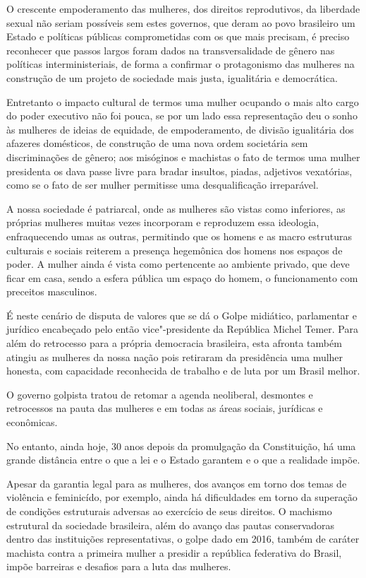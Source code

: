 O crescente empoderamento das mulheres, dos direitos reprodutivos, da
liberdade sexual não seriam possíveis sem estes governos, que deram ao
povo brasileiro um Estado e políticas públicas comprometidas com os que
mais precisam, é preciso reconhecer que passos largos foram dados na
transversalidade de gênero nas políticas interministeriais, de forma a
confirmar o protagonismo das mulheres na construção de um projeto de
sociedade mais justa, igualitária e democrática.

Entretanto o impacto cultural de termos uma mulher ocupando o mais alto
cargo do poder executivo não foi pouca, se por um lado essa
representação deu o sonho às mulheres de ideias de equidade, de
empoderamento, de divisão igualitária dos afazeres domésticos, de
construção de uma nova ordem societária sem discriminações de gênero;
aos misóginos e machistas o fato de termos uma mulher presidenta os dava
passe livre para bradar insultos, piadas, adjetivos vexatórias, como se
o fato de ser mulher permitisse uma desqualificação irreparável.

A nossa sociedade é patriarcal, onde as mulheres são vistas como
inferiores, as próprias mulheres muitas vezes incorporam e reproduzem
essa ideologia, enfraquecendo umas as outras, permitindo que os homens e
as macro estruturas culturais e sociais reiterem a presença hegemônica
dos homens nos espaços de poder. A mulher ainda é vista como pertencente
ao ambiente privado, que deve ficar em casa, sendo a esfera pública um
espaço do homem, o funcionamento com preceitos masculinos.

É neste cenário de disputa de valores que se dá o Golpe midiático,
parlamentar e jurídico encabeçado pelo então vice"-presidente da
República Michel Temer. Para além do retrocesso para a própria
democracia brasileira, esta afronta também atingiu as mulheres da nossa
nação pois retiraram da presidência uma mulher honesta, com capacidade
reconhecida de trabalho e de luta por um Brasil melhor.

O governo golpista tratou de retomar a agenda neoliberal, desmontes e
retrocessos na pauta das mulheres e em todas as áreas sociais, jurídicas
e econômicas.

No entanto, ainda hoje, 30 anos depois da promulgação da Constituição,
há uma grande distância entre o que a lei e o Estado garantem e o que a
realidade impõe.

Apesar da garantia legal para as mulheres, dos avanços em torno dos
temas de violência e feminicído, por exemplo, ainda há dificuldades em
torno da superação de condições estruturais adversas ao exercício de
seus direitos. O machismo estrutural da sociedade brasileira, além do
avanço das pautas conservadoras dentro das instituições representativas,
o golpe dado em 2016, também de caráter machista contra a primeira
mulher a presidir a república federativa do Brasil, impõe barreiras e
desafios para a luta das mulheres.

